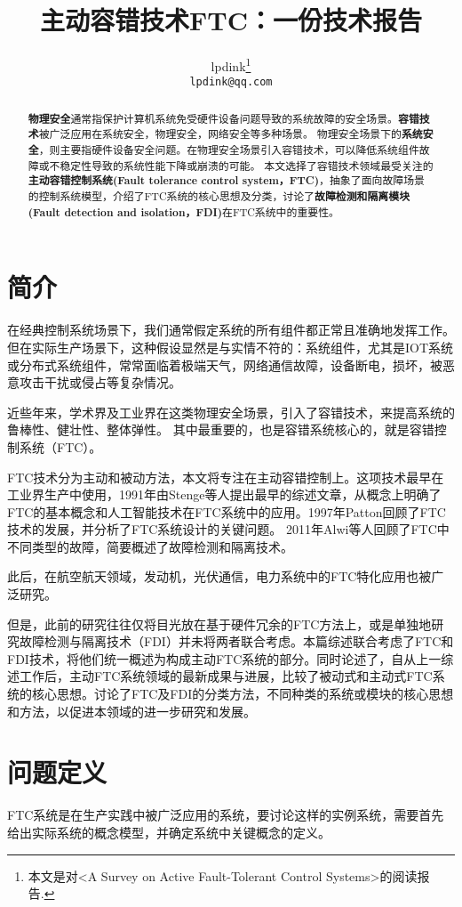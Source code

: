 \documentclass[UTF8]{article}
\title{主动容错技术FTC：一份技术报告}
\author{%
  lpdink\thanks{本文是对<A Survey on Active Fault-Tolerant Control Systems>\cite{AlirezaAbbaspour2020ASO}的阅读报告.} \\
  \texttt{lpdink@qq.com} \\
}
\begin{document}
\maketitle


\begin{abstract}
  \textbf{物理安全}通常指保护计算机系统免受硬件设备问题导致的系统故障的安全场景。\textbf{容错技术}被广泛应用在系统安全，物理安全，网络安全等多种场景。
  物理安全场景下的\textbf{系统安全}，则主要指硬件设备安全问题。在物理安全场景引入容错技术，可以降低系统组件故障或不稳定性导致的系统性能下降或崩溃的可能。
  本文选择了容错技术领域最受关注的\textbf{主动容错控制系统(Fault tolerance control system，FTC)}，抽象了面向故障场景的控制系统模型，介绍了FTC系统的核心思想及分类，讨论了\textbf{故障检测和隔离模块(Fault detection and isolation，FDI)}在FTC系统中的重要性。
\end{abstract}


\section{简介}
在经典控制系统场景下，我们通常假定系统的所有组件都正常且准确地发挥工作。
但在实际生产场景下，这种假设显然是与实情不符的：系统组件，尤其是IOT系统或分布式系统组件，常常面临着极端天气，网络通信故障，设备断电，损坏，被恶意攻击干扰或侵占等复杂情况。


近些年来，学术界及工业界在这类物理安全场景，引入了容错技术，来提高系统的鲁棒性、健壮性、整体弹性。
其中最重要的，也是容错系统核心的，就是容错控制系统（FTC）。


FTC技术分为主动和被动方法，本文将专注在主动容错控制上。这项技术最早在工业界生产中使用，1991年由Stenge\cite{RobertFStengel1990IntelligentFC}等人提出最早的综述文章，从概念上明确了FTC的基本概念和人工智能技术在FTC系统中的应用。1997年Patton\cite{PATTON19971029}回顾了FTC技术的发展，并分析了FTC系统设计的关键问题。
2011年Alwi\cite{HalimAlwi2011FaultDA}等人回顾了FTC中不同类型的故障，简要概述了故障检测和隔离技术。


此后，在航空航天领域，发动机，光伏通信，电力系统中的FTC特化应用也被广泛研究。


但是，此前的研究往往仅将目光放在基于硬件冗余的FTC方法上，或是单独地研究故障检测与隔离技术（FDI）并未将两者联合考虑。本篇综述联合考虑了FTC和FDI技术，将他们统一概述为构成主动FTC系统的部分。同时论述了，自从上一综述工作后，主动FTC系统领域的最新成果与进展，比较了被动式和主动式FTC系统的核心思想。讨论了FTC及FDI的分类方法，不同种类的系统或模块的核心思想和方法，以促进本领域的进一步研究和发展。
\section{问题定义}
FTC系统是在生产实践中被广泛应用的系统，要讨论这样的实例系统，需要首先给出实际系统的概念模型，并确定系统中关键概念的定义。
\end{document}
